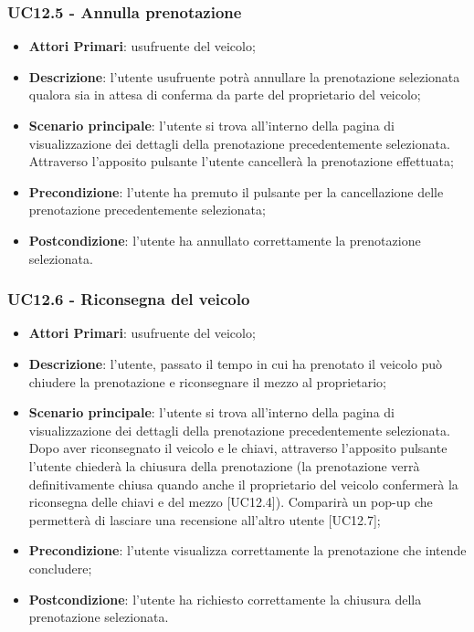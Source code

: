 \subsubsection{UC12.5 - Annulla prenotazione}
\begin{itemize}
	\item \textbf{Attori Primari}: usufruente del veicolo;
	\item \textbf{Descrizione}: l'utente usufruente potrà annullare la prenotazione selezionata qualora sia in attesa di conferma da parte del proprietario del veicolo;
	\item \textbf{Scenario principale}: l'utente si trova all'interno della pagina di visualizzazione dei dettagli della prenotazione precedentemente selezionata. Attraverso l'apposito pulsante l'utente cancellerà la prenotazione effettuata;
	\item \textbf{Precondizione}: l'utente ha premuto il pulsante per la cancellazione delle prenotazione precedentemente selezionata;
	\item \textbf{Postcondizione}: l'utente ha annullato correttamente la prenotazione selezionata.
\end{itemize}
\subsubsection{UC12.6 - Riconsegna del veicolo}
\begin{itemize}
	\item \textbf{Attori Primari}: usufruente del veicolo;
	\item \textbf{Descrizione}: l'utente, passato il tempo in cui ha prenotato il veicolo può chiudere la prenotazione e riconsegnare il mezzo al proprietario;
	\item \textbf{Scenario principale}: l'utente si trova all'interno della pagina di visualizzazione dei dettagli della prenotazione precedentemente selezionata. Dopo aver riconsegnato il veicolo e le chiavi, attraverso l'apposito pulsante l'utente chiederà la chiusura della prenotazione (la prenotazione verrà definitivamente chiusa quando anche il proprietario del veicolo confermerà la riconsegna delle chiavi e del mezzo [UC12.4]). Comparirà un pop-up che permetterà di lasciare una recensione all'altro utente [UC12.7];
	\item \textbf{Precondizione}: l'utente visualizza correttamente la prenotazione che intende concludere;
	\item \textbf{Postcondizione}: l'utente ha richiesto correttamente la chiusura della prenotazione selezionata.
\end{itemize}

